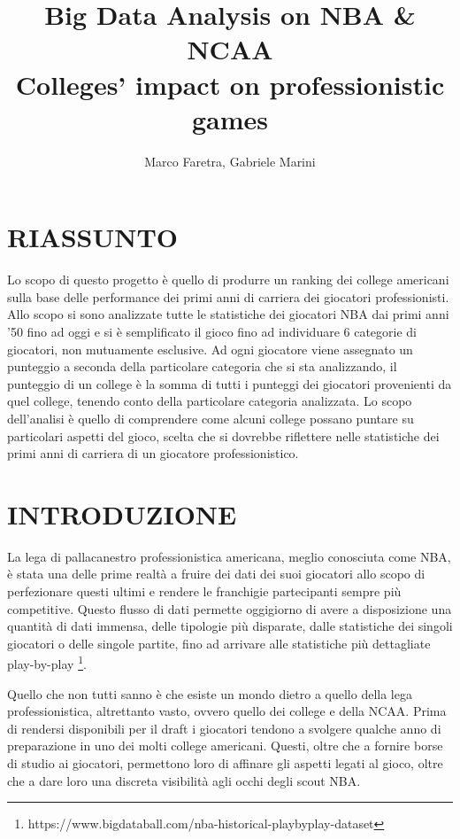 \documentclass[10pt,a4paper,twocolumn]{article}
\author{Marco Faretra, Gabriele Marini}
\title{\textbf{Big Data Analysis on NBA \& NCAA}\\Colleges' impact on professionistic games}
\begin{document}
	
\maketitle
\thispagestyle{empty}
\pagestyle{empty}
		
\section*{RIASSUNTO}

Lo scopo di questo progetto è quello di produrre un ranking dei college americani sulla base delle performance dei primi anni di carriera dei giocatori professionisti. Allo scopo si sono analizzate tutte le statistiche dei giocatori NBA dai primi anni '50 fino ad oggi e si è semplificato il gioco fino ad individuare 6 categorie di giocatori, non mutuamente esclusive.
Ad ogni giocatore viene assegnato un punteggio a seconda della particolare categoria che si sta analizzando, il punteggio di un college è la somma di tutti i punteggi dei giocatori provenienti da quel college, tenendo conto della particolare categoria analizzata. Lo scopo dell'analisi è quello di comprendere come alcuni college possano puntare su particolari aspetti del gioco, scelta che si dovrebbe riflettere nelle statistiche dei primi anni di carriera di un giocatore professionistico.


\section{INTRODUZIONE} 

La lega di pallacanestro professionistica americana, meglio conosciuta come NBA, è stata una delle prime realtà a fruire dei dati dei suoi giocatori allo scopo di perfezionare questi ultimi e rendere le franchigie partecipanti sempre più competitive. Questo flusso di dati permette oggigiorno di avere a disposizione una quantità di dati immensa, delle tipologie più disparate, dalle statistiche dei singoli giocatori o delle singole partite, fino ad arrivare alle statistiche più dettagliate play-by-play \footnote{https://www.bigdataball.com/nba-historical-playbyplay-dataset}.

Quello che non tutti sanno è che esiste un mondo dietro a quello della lega professionistica, altrettanto vasto, ovvero quello dei college e della NCAA. Prima di rendersi disponibili per il draft i giocatori tendono a svolgere qualche anno di preparazione in uno dei molti college americani. Questi, oltre che a fornire borse di studio ai giocatori, permettono loro di affinare gli aspetti legati al gioco, oltre che a dare loro una discreta visibilità agli occhi degli scout NBA.
\end{document}
